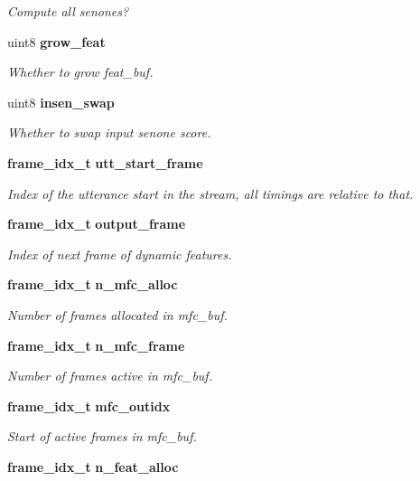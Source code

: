 \begin{DoxyCompactItemize}
\begin{DoxyCompactList}\small\item\em Compute all senones? \end{DoxyCompactList}\item 
uint8 {\bf grow\+\_\+feat}
\begin{DoxyCompactList}\small\item\em Whether to grow feat\+\_\+buf. \end{DoxyCompactList}\item 
uint8 {\bf insen\+\_\+swap}
\begin{DoxyCompactList}\small\item\em Whether to swap input senone score. \end{DoxyCompactList}\item 
{\bf frame\+\_\+idx\+\_\+t} {\bf utt\+\_\+start\+\_\+frame}
\begin{DoxyCompactList}\small\item\em Index of the utterance start in the stream, all timings are relative to that. \end{DoxyCompactList}\item 
{\bf frame\+\_\+idx\+\_\+t} {\bf output\+\_\+frame}
\begin{DoxyCompactList}\small\item\em Index of next frame of dynamic features. \end{DoxyCompactList}\item 
{\bf frame\+\_\+idx\+\_\+t} {\bf n\+\_\+mfc\+\_\+alloc}\label{structacmod__s_af4fa71ce8be75356a1f472959a9ff6d1}

\begin{DoxyCompactList}\small\item\em Number of frames allocated in mfc\+\_\+buf. \end{DoxyCompactList}\item 
{\bf frame\+\_\+idx\+\_\+t} {\bf n\+\_\+mfc\+\_\+frame}\label{structacmod__s_a1c5d63882997211e57ed698e33080958}

\begin{DoxyCompactList}\small\item\em Number of frames active in mfc\+\_\+buf. \end{DoxyCompactList}\item 
{\bf frame\+\_\+idx\+\_\+t} {\bf mfc\+\_\+outidx}\label{structacmod__s_afc6ef051f5de03c3f51aa740ff10a99b}

\begin{DoxyCompactList}\small\item\em Start of active frames in mfc\+\_\+buf. \end{DoxyCompactList}\item 
{\bf frame\+\_\+idx\+\_\+t} {\bf n\+\_\+feat\+\_\+alloc}\label{structacmod__s_a8269cb11354683ba83f1994b46e15466}


\end{DoxyCompactItemize}
